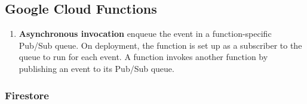 

\subsection{Google Cloud Functions}

\begin{enumerate}
  \item \textbf{Asynchronous invocation} enqueue the event in a function-specific Pub/Sub queue. On deployment, the function is set up as a subscriber to the queue to run for each event. A function invokes another function by publishing an event to its Pub/Sub queue.
\end{enumerate}

\subsubsection{Firestore}

